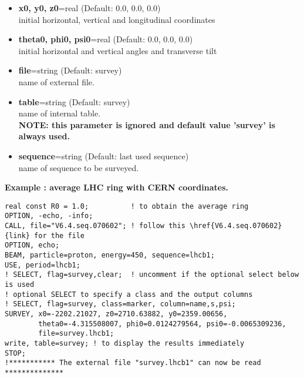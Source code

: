 \begin{itemize}
\item {\bf x0, y0, z0}=real (Default: 0.0, 0.0, 0.0)\\
initial horizontal, vertical and longitudinal coordinates 
\item {\bf theta0, phi0, psi0}=real (Default: 0.0, 0.0, 0.0)\\
initial horizontal and vertical angles  and transverse tilt
\item {\bf file}=string (Default: survey)\\
name of external file.
\item {\bf table}=string (Default: survey)\\
name of internal table. \\
{\bf NOTE: this parameter is ignored and default value 'survey' is always used.}
\item {\bf sequence}=string (Default: last used sequence)\\
name of sequence to be surveyed.
\end{itemize}

{\bf Example : average LHC ring with CERN coordinates.}
\begin{verbatim}
real const R0 = 1.0;          ! to obtain the average ring
OPTION, -echo, -info;
CALL, file="V6.4.seq.070602"; ! follow this \href{V6.4.seq.070602}{link} for the file
OPTION, echo;
BEAM, particle=proton, energy=450, sequence=lhcb1;
USE, period=lhcb1;
! SELECT, flag=survey,clear;  ! uncomment if the optional select below is used
! optional SELECT to specify a class and the output columns
! SELECT, flag=survey, class=marker, column=name,s,psi;
SURVEY, x0=-2202.21027, z0=2710.63882, y0=2359.00656,
        theta0=-4.315508007, phi0=0.0124279564, psi0=-0.0065309236,
        file=survey.lhcb1;
write, table=survey; ! to display the results immediately
STOP;
!*********** The external file "survey.lhcb1" can now be read **************
\end{verbatim}

